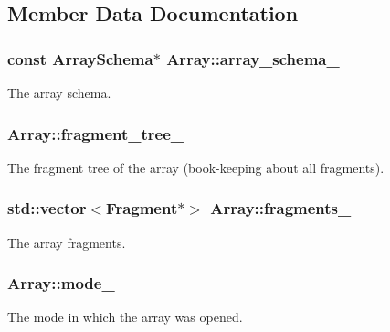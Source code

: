 \subsection{Member Data Documentation}
\hypertarget{classArray_a5499e3946904ceb3c1f9dbeba54e23aa}{}
\subsubsection[{array\+\_\+schema\+\_\+}]{\setlength{\rightskip}{0pt plus 5cm}const {\bf Array\+Schema}$\ast$ Array\+::array\+\_\+schema\+\_\+\hspace{0.3cm}{\ttfamily [private]}}\label{classArray_a5499e3946904ceb3c1f9dbeba54e23aa}
The array schema. \hypertarget{classArray_ae2c7e4b3dd4543b83398eb59be937fb8}{}
\subsubsection[{fragment\+\_\+tree\+\_\+}]{ Array\+::fragment\+\_\+tree\+\_\+\hspace{0.3cm}{\ttfamily [private]}}\label{classArray_ae2c7e4b3dd4543b83398eb59be937fb8}
The fragment tree of the array (book-\/keeping about all fragments). \hypertarget{classArray_a1affe7c22be3ad39bc8636840d8cc148}{}
\subsubsection[{fragments\+\_\+}]{\setlength{\rightskip}{0pt plus 5cm}std\+::vector$<${\bf Fragment}$\ast$$>$ Array\+::fragments\+\_\+\hspace{0.3cm}{\ttfamily [private]}}\label{classArray_a1affe7c22be3ad39bc8636840d8cc148}
The array fragments. \hypertarget{classArray_aef623a8cbd136892ffa321404513855b}{}
\subsubsection[{mode\+\_\+}]{ Array\+::mode\+\_\+\hspace{0.3cm}{\ttfamily [private]}}\label{classArray_aef623a8cbd136892ffa321404513855b}
The mode in which the array was opened. \hypertarget{classArray_a7872787919cfff80a1205372c9ec440c}{}
